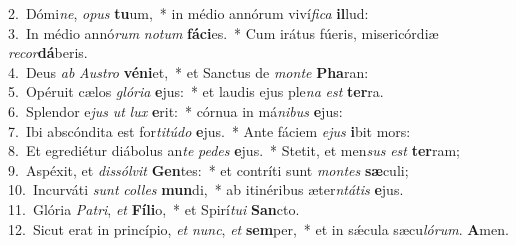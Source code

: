 {2.~}Dómi\textit{ne}, \textit{o}\textit{pus} \textbf{tu}um,~* in médio annórum viví\textit{fi}\textit{ca} \textbf{il}lud:\\
{3.~}In médio annó\textit{rum} \textit{no}\textit{tum} \textbf{fá}\textbf{ci}es.~* Cum irátus fúeris, misericórdiæ \textit{re}\textit{cor}\textbf{dá}beris.\\
{4.~}Deus \textit{ab} \textit{Au}\textit{stro} \textbf{vé}\textbf{ni}et,~* et Sanctus de \textit{mon}\textit{te} \textbf{Pha}ran:\\
{5.~}Opéruit cælos \textit{gló}\textit{ri}\textit{a} \textbf{e}jus:~* et laudis ejus ple\textit{na} \textit{est} \textbf{ter}ra.\\
{6.~}Splendor e\textit{jus} \textit{ut} \textit{lux} \textbf{e}rit:~* córnua in má\textit{ni}\textit{bus} \textbf{e}jus:\\
{7.~}Ibi abscóndita est for\textit{ti}\textit{tú}\textit{do} \textbf{e}jus.~* Ante fáciem \textit{e}\textit{jus} \textbf{i}bit mors:\\
{8.~}Et egrediétur diábolus an\textit{te} \textit{pe}\textit{des} \textbf{e}jus.~* Stetit, et men\textit{sus} \textit{est} \textbf{ter}ram;\\
{9.~}Aspéxit, et \textit{dis}\textit{sól}\textit{vit} \textbf{Gen}tes:~* et contríti sunt \textit{mon}\textit{tes} \textbf{sæ}culi;\\
{10.~}Incurváti \textit{sunt} \textit{col}\textit{les} \textbf{mun}di,~* ab itinéribus æter\textit{ntá}\textit{tis} \textbf{e}jus.\\
{11.~}Glória \textit{Pa}\textit{tri}, \textit{et} \textbf{Fí}\textbf{li}o,~* et Spirí\textit{tu}\textit{i} \textbf{San}cto.\\
{12.~}Sicut erat in princípio, \textit{et} \textit{nunc}, \textit{et} \textbf{sem}per,~* et in sǽcula sæcu\textit{ló}\textit{rum}. \textbf{A}men.\\
